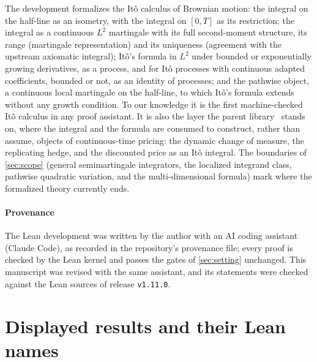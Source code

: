 \documentclass[11pt]{article}
\begin{document}
The development formalizes the It\^o calculus of Brownian motion: the integral on the half-line as an isometry, with the
integral on $[0,T]$ as its restriction; the integral as a continuous $L^2$ martingale with its full second-moment
structure, its range (martingale representation) and its uniqueness (agreement with the upstream axiomatic integral);
It\^o's formula in $L^2$ under bounded or exponentially growing derivatives, as a process, and for It\^o processes with
continuous adapted coefficients, bounded or not, as an identity of processes; and the pathwise object, a
continuous local martingale on the half-line, to which It\^o's formula extends without any growth condition. To our
knowledge it is the first machine-checked It\^o calculus in any proof assistant. It is also the layer the parent
library~\cite{CoelhoLibrary} stands on, where the integral and the formula are consumed to construct, rather than assume,
objects of continuous-time pricing: the dynamic change of measure, the replicating hedge, and the discounted price
as an It\^o integral. The boundaries of \cref{sec:scope} (general semimartingale integrators, the
localized integrand class, pathwise quadratic variation, and the multi-dimensional formula) mark where the formalized
theory currently ends.

\paragraph{Provenance}
The Lean development was written by the author with an AI coding assistant (Claude Code), as recorded in the
repository's provenance file; every proof is checked by the Lean kernel and passes the gates of \cref{sec:setting}
unchanged. This manuscript was revised with the same assistant, and its statements were checked against the Lean
sources of release \texttt{v1.11.0}.

\appendix
\section{Displayed results and their Lean names}\label{app:names}
\end{document}
